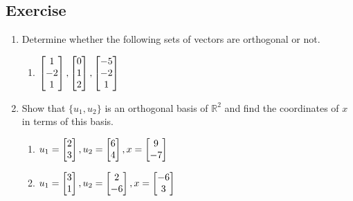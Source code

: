 \documentclass[aima104_lecturenotes_ku.tex]{subfiles}
\begin{document}
\subsection{Exercise}
\begin{enumerate}
\item Determine whether the following sets of vectors are orthogonal or not.
  \begin{enumerate}
  \item $
    \begin{bmatrix}
      1 \\ -2 \\ 1
    \end{bmatrix}, \vspace{5mm}
    \begin{bmatrix}
      0 \\ 1 \\ 2
    \end{bmatrix},  \vspace{5mm}
    \begin{bmatrix}
      -5 \\ -2 \\ 1
    \end{bmatrix}$
  \end{enumerate}

\item Show that $\{u_1, u_2\}$ is an orthogonal basis of $\mathbb{R}^2$ and find the coordinates of $x$ in terms of this basis.
  \begin{enumerate}
  \item   $u_1 =
  \begin{bmatrix}
    2 \\ 3
  \end{bmatrix} ,  \vspace{5mm}
  u_2 =
  \begin{bmatrix}
    6 \\ 4
  \end{bmatrix},  \vspace{5mm}
  x =
  \begin{bmatrix}
    9 \\ -7
  \end{bmatrix}
  $

 \item $u_1 =
  \begin{bmatrix}
    3 \\ 1
  \end{bmatrix} ,  \vspace{5mm}
  u_2 =
  \begin{bmatrix}
    2 \\ -6
  \end{bmatrix},  \vspace{5mm}
  x =
  \begin{bmatrix}
    -6 \\ 3
  \end{bmatrix}
  $


\end{enumerate}
\end{enumerate}
\end{document}
